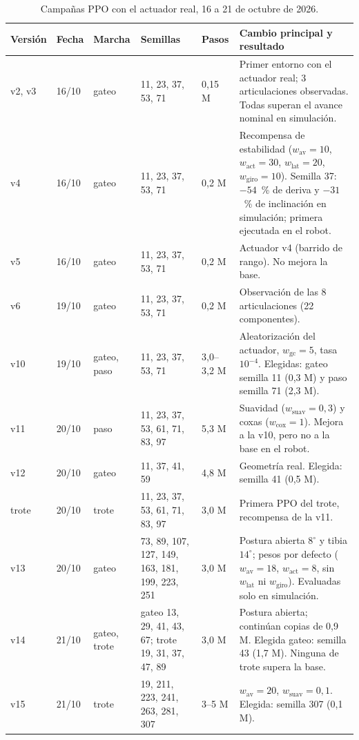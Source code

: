 \begin{table}[H]
\centering
\caption{Campañas PPO con el actuador real, 16 a 21 de octubre de 2026.}
\label{tab:campanas-ppo}
\scriptsize
\setlength{\tabcolsep}{3pt}
\begin{tabular}{p{}p{}p{}p{}p{}p{}}
\toprule
Versión & Fecha & Marcha & Semillas & Pasos & Cambio principal y resultado \\
\midrule
v2, v3 & 16/10 & gateo & 11, 23, 37, 53, 71 & 0,15 M & Primer entorno con el actuador real; 3 articulaciones observadas. Todas superan el avance nominal en simulación. \\
v4 & 16/10 & gateo & 11, 23, 37, 53, 71 & 0,2 M & Recompensa de estabilidad ($w_{\text{av}}=10$, $w_{\text{act}}=30$, $w_{\text{lat}}=20$, $w_{\text{giro}}=10$). Semilla 37: $-54$~\% de deriva y $-31$~\% de inclinación en simulación; primera ejecutada en el robot. \\
v5 & 16/10 & gateo & 11, 23, 37, 53, 71 & 0,2 M & Actuador v4 (barrido de rango). No mejora la base. \\
v6 & 19/10 & gateo & 11, 23, 37, 53, 71 & 0,2 M & Observación de las 8 articulaciones (22 componentes). \\
v10 & 19/10 & gateo, paso & 11, 23, 37, 53, 71 & 3,0--3,2 M & Aleatorización del actuador, $w_{\text{gc}}=5$, tasa $10^{-4}$. Elegidas: gateo semilla 11 (0,3 M) y paso semilla 71 (2,3 M). \\
v11 & 20/10 & paso & 11, 23, 37, 53, 61, 71, 83, 97 & 5,3 M & Suavidad ($w_{\text{suav}}=0{,}3$) y coxas ($w_{\text{cox}}=1$). Mejora a la v10, pero no a la base en el robot. \\
v12 & 20/10 & gateo & 11, 37, 41, 59 & 4,8 M & Geometría real. Elegida: semilla 41 (0,5 M). \\
trote & 20/10 & trote & 11, 23, 37, 53, 61, 71, 83, 97 & 3,0 M & Primera PPO del trote, recompensa de la v11. \\
v13 & 20/10 & gateo & 73, 89, 107, 127, 149, 163, 181, 199, 223, 251 & 3,0 M & Postura abierta $8^\circ$ y tibia $14^\circ$; pesos por defecto ($w_{\text{av}}=18$, $w_{\text{act}}=8$, sin $w_{\text{lat}}$ ni $w_{\text{giro}}$). Evaluadas solo en simulación. \\
v14 & 21/10 & gateo, trote & gateo 13, 29, 41, 43, 67; trote 19, 31, 37, 47, 89 & 3,0 M & Postura abierta; continúan copias de 0,9 M. Elegida gateo: semilla 43 (1,7 M). Ninguna de trote supera la base. \\
v15 & 21/10 & trote & 19, 211, 223, 241, 263, 281, 307 & 3--5 M & $w_{\text{av}}=20$, $w_{\text{suav}}=0{,}1$. Elegida: semilla 307 (0,1 M). \\

\end{tabular}
\end{table}
